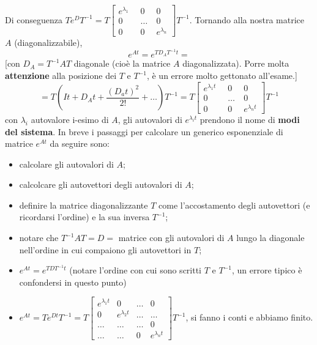 Di conseguenza $T e^{D}T^{-1} = T \left[\begin{matrix}
    e^{\lambda_1} \;\; &0 \;\; &0\\
    0 & \dots &0\\
    0 &0 & e^{\lambda_n}
\end{matrix}\right] T^{-1}$.\newline
Tornando alla nostra matrice $A$ (diagonalizzabile), 
\[
    e^{At}= e^{TD_AT^{-1}t} =
\] 
[con $D_A = T^{-1} A T$ diagonale (cioè la matrice $A$ diagonalizzata). Porre molta \textbf{attenzione} alla posizione dei $T$ e $T^{-1}$, è un errore molto gettonato all'esame.]
\[
    = T(It + D_A t + \frac{(D_at)^2}{2!} + \dots)T^{-1} =  T \left[\begin{matrix}
        e^{\lambda_1t} \;\; &0 \;\; &0\\
        0 & \dots &0\\
        0 &0 & e^{\lambda_nt}
    \end{matrix}\right]T^{-1}
\] con $\lambda_i$ autovalore i-esimo di $A$, gli autovalori di $e^{\lambda_it}$ prendono il nome di \textbf{modi del sistema}.\newline
\newline
In breve i passaggi per calcolare un generico esponenziale di matrice $e^{At}$ da seguire sono:
\begin{itemize}
    \item calcolare gli autovalori di $A$;
    \item calcolcare gli autovettori degli autovalori di $A$;
    \item definire la matrice diagonalizzante $T$ come l'accostamento degli autovettori (e ricordarsi l'ordine) e la sua inversa $T^{-1}$;
    \item notare che $T^{-1} A T = D =$ matrice con gli autovalori di $A$ lungo la diagonale nell'ordine in cui compaiono gli autovettori in $T$;
    \item $e^{At}= e^{T D T^{-1} t}$ (notare l'ordine con cui sono scritti $T$ e $T^{-1}$, un errore tipico è confondersi in questo punto)
    \item $e^{At} = T e^{D t} T^{-1} = T \left[\begin{matrix}
        e^{\lambda_1 t} & 0 & \dots & 0\\
        0 & e^{\lambda_2 t} & \dots & \dots\\
        \dots & \dots & \dots & 0\\
        \dots & \dots & 0 & e^{\lambda_n t}
    \end{matrix}\right] T^{-1}$, si fanno i conti e abbiamo finito.
\end{itemize}
